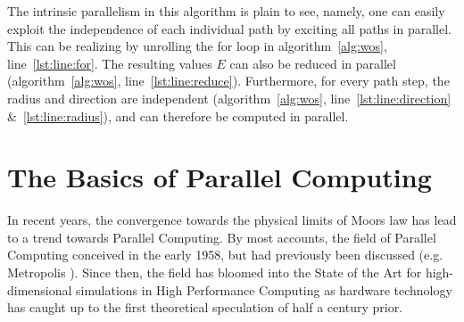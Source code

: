 The intrinsic parallelism in this algorithm is plain to see, namely, one can easily
exploit the independence of each individual path by exciting all paths in parallel.
This can be realizing by unrolling the for loop in algorithm~\ref{alg:wos}, line~\ref{lst:line:for}.
The resulting values $E$ can also be reduced in parallel (algorithm~\ref{alg:wos}, line~\ref{lst:line:reduce}).  Furthermore, for every path step,
the radius and direction are independent (algorithm~\ref{alg:wos}, line~\ref{lst:line:direction} \&~\ref{lst:line:radius}),
 and can therefore be computed in parallel. \cite{Muller,DeLaurentis,Bornemann}

\section{The Basics of Parallel Computing}
In recent years, the convergence towards the physical limits of Moors law has lead to a
trend towards Parallel Computing\cite{Kumar}\cite{Markov}.  By most accounts, the
field of Parallel Computing conceived in the early 1958\cite{Gill}, but had previously
been discussed (e.g. Metropolis \cite{Metropolis}). Since then, the field has
 bloomed into the State of the Art for high-dimensional simulations in
High Performance Computing as hardware technology has caught up to the first
theoretical speculation of half a century prior. \par

